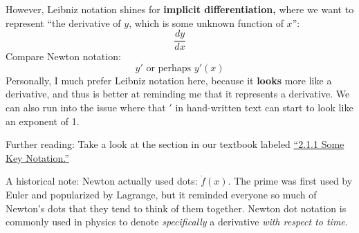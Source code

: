 	However, Leibniz notation shines for \textbf{implicit differentiation,} where we want to represent ``the derivative of $y$, which is some unknown function of $x$'':
	\[\frac{dy}{dx}\]
	Compare Newton notation: \[y' \textrm{ or perhaps } y'(x)\]
	Personally, I much prefer Leibniz notation here, because it \textbf{looks} more like a derivative, and thus is better at reminding me that it represents a derivative. We can also run into the issue where that $'$ in hand-written text can start to look like an exponent of 1.

    \hrulefill
	
	Further reading: Take a look at the section in our textbook labeled \href{https://activecalculus.org/single/sec-2-1-elem-rules.html#sec-2-1-elem-rules-4}{``2.1.1 Some Key Notation.''}

	
	A historical note: Newton actually used dots: $\dot f(x)$. The prime was first used by Euler and popularized by Lagrange, but it reminded everyone so much of Newton's dots that they tend to think of them together. Newton dot notation is commonly used in physics to denote \textit{specifically} a derivative \textit{with respect to time}.

